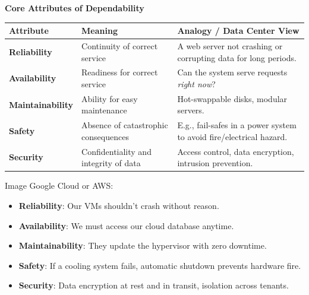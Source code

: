 \highspace
\begin{flushleft}
    \textcolor{Green3}{ \textbf{Core Attributes of Dependability}}
\end{flushleft}
\begin{table}[!htp]
    \centering
    \begin{adjustbox}{width={\textwidth},totalheight={\textheight},keepaspectratio}
        \begin{tabular}{@{} l p{13em} p{17em} @{}}
            \toprule
            \textbf{Attribute} & \textbf{Meaning} & \textbf{Analogy / Data Center View} \\
            \midrule
            \textbf{Reliability}        & Continuity of correct service         & A web server not crashing or corrupting data for long periods. \\ [.5em]
            \textbf{Availability}       & Readiness for correct service         & Can the system serve requests \emph{right now}? \\ [.5em]
            \textbf{Maintainability}    & Ability for easy maintenance          & Hot-swappable disks, modular servers. \\ [.5em]
            \textbf{Safety}             & Absence of catastrophic consequences  & E.g., fail-safes in a power system to avoid fire/electrical hazard. \\ [.5em]
            \textbf{Security}           & Confidentiality and integrity of data & Access control, data encryption, intrusion prevention. \\
            \bottomrule
        \end{tabular}
    \end{adjustbox}
\end{table}

\begin{examplebox}
    Image Google Cloud or AWS:
    \begin{itemize}
        \item \textbf{Reliability}: Our VMs shouldn't crash without reason.
        \item \textbf{Availability}: We must access our cloud database anytime.
        \item \textbf{Maintainability}: They update the hypervisor with zero downtime.
        \item \textbf{Safety}: If a cooling system fails, automatic shutdown prevents hardware fire.
        \item \textbf{Security}: Data encryption at rest and in transit, isolation across tenants.
    \end{itemize}
\end{examplebox}

